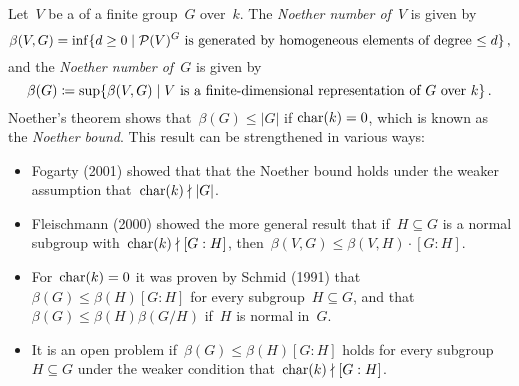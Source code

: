 \begin{remark}
  Let~$V$ be a {\fd} of a finite group~$G$ over~$k$.
  The \emph{Noether number of~$V$} is given by
  \[
    \beta(V,G)
      =
    \inf
    \{
      d \geq 0
    \suchthat
      \text{$\Pol(V)^G$ is generated by homogeneous elements of degree~$\leq d$}
    \} \,,
  \]
  and the \emph{Noether number of~$G$} is given by
  \[
    \beta(G)
      \defined
    \sup
    \{
      \beta(V,G)
    \suchthat
      \text{$V$ is a {\fd} representation of~$G$ over~$k$}
    \} \,.
  \]
  Noether’s theorem shows that~$\beta(G) \leq |G|$ if $\operatorname{char}(k) = 0$, which is known as the \emph{Noether bound}.
  This result can be strengthened in various ways:
  \begin{itemize}
    \item
      Fogarty (2001) showed that that the Noether bound holds under the weaker assumption that~$\operatorname{char}(k) \nmid \lvert G\rvert$.
    \item
      Fleischmann (2000) showed the more general result that if~$H \subseteq G$ is a normal subgroup with~$\operatorname{char}(k) \nmid [G : H]$, then~$\beta(V,G) \leq \beta(V,H) \cdot [G : H]$.
    \item
      For~$\operatorname{char}(k) = 0$ it was proven by Schmid (1991) that~$\beta(G) \leq \beta(H)[G : H]$ for every subgroup~$H \subseteq G$, and that~$\beta(G) \leq \beta(H)\beta(G/H)$ if~$H$ is normal in~$G$.
    \item
      It is an open problem if~$\beta(G) \leq \beta(H)[G : H]$ holds for every subgroup~$H \subseteq G$ under the weaker condition that~$\operatorname{char}(k) \nmid [G : H]$.
  \end{itemize}
\end{remark}




